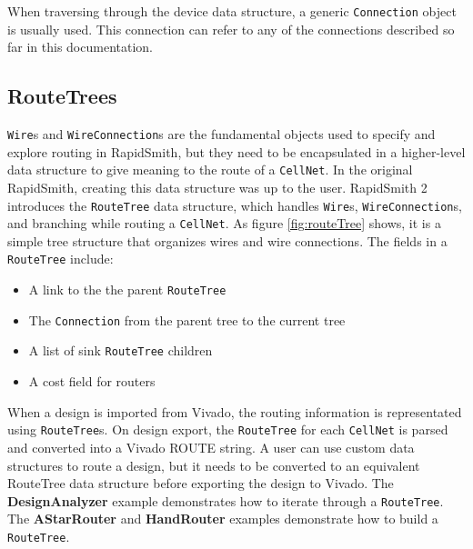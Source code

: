 \documentclass[12pt]{article}
\newcommand{\cls}[1]{{\texttt{#1}}}
\newcommand{\pgm}[1]{{\textbf{#1}}}
\begin{document}
\noindent
When traversing through the device data structure, a generic \cls{Connection}
object is usually used. This connection can refer to any of the connections
described so far in this documentation.

\subsection{RouteTrees}

\cls{Wire}s and \cls{WireConnection}s are the fundamental objects used to
specify and explore routing in RapidSmith, but they need to be encapsulated in
a higher-level data structure to give meaning to the route of a \cls{CellNet}.
In the original RapidSmith, creating this data structure was up to the user.
RapidSmith 2 introduces the \cls{RouteTree} data structure, which handles
\cls{Wire}s, \cls{WireConnection}s, and branching while routing a
\cls{CellNet}. As figure \ref{fig:routeTree} shows, it is a simple tree
structure that organizes wires and wire connections. The fields in
a \cls{RouteTree} include:

\begin{itemize}
  \item A link to the the parent \cls{RouteTree}
  \item The \cls{Connection} from the parent tree to the current tree
  \item A list of sink \cls{RouteTree} children
  \item A cost field for routers 
\end{itemize}

\noindent
When a design is imported from Vivado, the routing information is representated
using \cls{Route\-Tree}s. On design export, the \cls{RouteTree} for each
\cls{CellNet} is parsed and converted into a Vivado ROUTE string. A user can use
custom data structures to route a design, but it needs to be
converted to an equivalent RouteTree data structure before exporting the
design to Vivado. The \pgm{DesignAnalyzer} example demonstrates how to
iterate through a \cls{RouteTree}. The \pgm{AStarRouter} and \pgm{HandRouter}
examples demonstrate how to build a \cls{RouteTree}.
\end{document}
